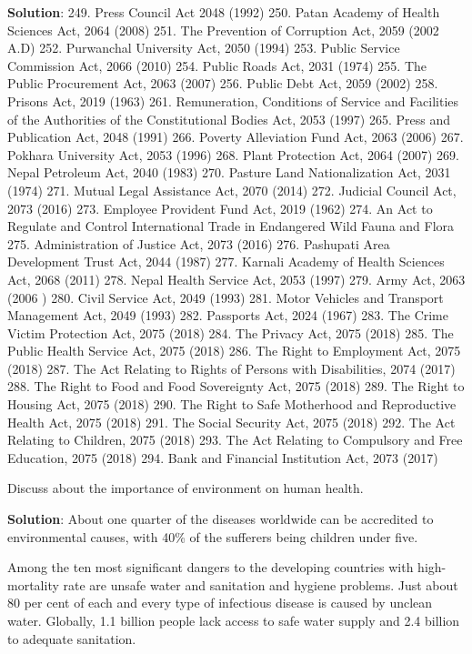 \documentclass[
  openany]{book}
\newcommand{\question}{\item}
\newenvironment{solution}{ {\bfseries Solution}:}{}
\begin{document}
\begin{questions}
\begin{solution}
249. Press Council Act 2048 (1992) 
250. Patan Academy of Health Sciences Act, 2064 (2008)
251. The Prevention of Corruption Act, 2059 (2002 A.D)
252. Purwanchal University Act, 2050 (1994)
253. Public Service Commission Act, 2066 (2010)
254. Public Roads Act, 2031 (1974)
255. The Public Procurement Act, 2063 (2007)
256. Public Debt Act, 2059 (2002)
258. Prisons Act, 2019 (1963)
261. Remuneration, Conditions of Service and Facilities of the Authorities of the Constitutional Bodies Act, 2053 (1997)
265. Press and Publication Act, 2048 (1991)
266. Poverty Alleviation Fund Act, 2063 (2006)
267. Pokhara University Act, 2053 (1996)
268. Plant Protection Act, 2064 (2007)
269. Nepal Petroleum Act, 2040 (1983)
270. Pasture Land Nationalization Act, 2031 (1974)
271. Mutual Legal Assistance Act, 2070 (2014)
272. Judicial Council Act, 2073 (2016)
273. Employee Provident Fund Act, 2019 (1962)
274. An Act to Regulate and Control International Trade in Endangered Wild Fauna and Flora
275. Administration of Justice Act, 2073 (2016)
276. Pashupati Area Development Trust Act, 2044 (1987)
277. Karnali Academy of Health Sciences Act, 2068 (2011)
278. Nepal Health Service Act, 2053 (1997)
279. Army Act, 2063 (2006 )
280. Civil Service Act, 2049 (1993)
281. Motor Vehicles and Transport Management Act, 2049 (1993)
282. Passports Act, 2024 (1967)
283. The Crime Victim Protection Act, 2075 (2018)
284. The Privacy Act, 2075 (2018)
285. The Public Health Service Act, 2075 (2018)
286. The Right to Employment Act, 2075 (2018)
287. The Act Relating to Rights of Persons with Disabilities, 2074 (2017)
288. The Right to Food and Food Sovereignty Act, 2075 (2018)
289. The Right to Housing Act, 2075 (2018)
290. The Right to Safe Motherhood and Reproductive Health Act, 2075 (2018)
291. The Social Security Act, 2075 (2018)
292. The Act Relating to Children, 2075 (2018)
293. The Act Relating to Compulsory and Free Education, 2075 (2018)
294. Bank and Financial Institution Act, 2073 (2017)
\end{solution}

\question Discuss about the importance of environment on human health.

\begin{solution}
About one quarter of the diseases worldwide can be accredited to environmental causes, with 40\% of the sufferers being children under five.

Among the ten most significant dangers to the developing countries with high-mortality rate are unsafe water and sanitation and hygiene problems. Just about 80 per cent of each and every type of infectious disease is caused by unclean water. Globally, 1.1 billion people lack access to safe water supply and 2.4 billion to adequate sanitation.


\end{solution}
\end{questions}
\end{document}
